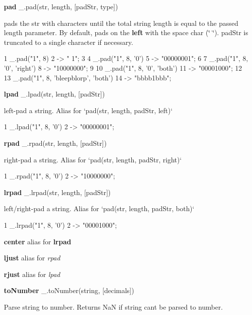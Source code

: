 {\bfseries pad} \+\_\+.\+pad(str, length, \mbox{[}pad\+Str, type\mbox{]})

pads the {\ttfamily str} with characters until the total string length is equal to the passed {\ttfamily length} parameter. By default, pads on the {\bfseries left} with the space char ({\ttfamily \char`\"{} \char`\"{}}). {\ttfamily pad\+Str} is truncated to a single character if necessary.


\begin{DoxyCode}
1 \_.pad("1", 8)
2 -> "       1";
3 
4 \_.pad("1", 8, '0')
5 -> "00000001";
6 
7 \_.pad("1", 8, '0', 'right')
8 -> "10000000";
9 
10 \_.pad("1", 8, '0', 'both')
11 -> "00001000";
12 
13 \_.pad("1", 8, 'bleepblorp', 'both')
14 -> "bbbb1bbb";
\end{DoxyCode}


{\bfseries lpad} \+\_\+.\+lpad(str, length, \mbox{[}pad\+Str\mbox{]})

left-\/pad a string. Alias for `pad(str, length, pad\+Str, \textquotesingle{}left\textquotesingle{})`


\begin{DoxyCode}
1 \_.lpad("1", 8, '0')
2 -> "00000001";
\end{DoxyCode}


{\bfseries rpad} \+\_\+.\+rpad(str, length, \mbox{[}pad\+Str\mbox{]})

right-\/pad a string. Alias for `pad(str, length, pad\+Str, \textquotesingle{}right\textquotesingle{})`


\begin{DoxyCode}
1 \_.rpad("1", 8, '0')
2 -> "10000000";
\end{DoxyCode}


{\bfseries lrpad} \+\_\+.\+lrpad(str, length, \mbox{[}pad\+Str\mbox{]})

left/right-\/pad a string. Alias for `pad(str, length, pad\+Str, \textquotesingle{}both\textquotesingle{})`


\begin{DoxyCode}
1 \_.lrpad("1", 8, '0')
2 -> "00001000";
\end{DoxyCode}


{\bfseries center} alias for {\bfseries lrpad}

{\bfseries ljust} alias for {\itshape rpad}

{\bfseries rjust} alias for {\itshape lpad}

{\bfseries to\+Number} \+\_\+.\+to\+Number(string, \mbox{[}decimals\mbox{]})

Parse string to number. Returns Na\+N if string can\textquotesingle{}t be parsed to number.


